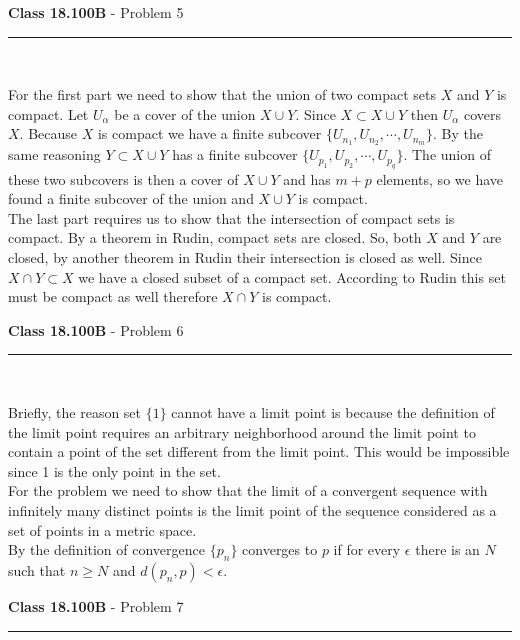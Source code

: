 \documentclass[11pt,reqno]{article}
\begin{document}
\vspace{15pt}
\begin{flushleft} 
\textbf{Class 18.100B} - Problem 5\\
\rule{500pt}{1pt}\\
\end{flushleft} 

For the first part we need to show that the union of two compact sets $X$ and $Y$ is compact. Let $U_{\alpha}$ be a cover of the union $X \cup Y$. Since $X \subset X \cup Y$ then $U_{\alpha}$ covers $X$. Because $X$ is compact we have a finite subcover $\{ U_{n_1}, U_{n_2}, \cdots, U_{n_m} \}$. By the same reasoning $Y \subset X \cup Y$ has a finite subcover $\{ U_{p_1}, U_{p_2}, \cdots, U_{p_q} \}$. The union of these two subcovers is then a cover of $X \cup Y$ and has $m + p$ elements, so we have found a finite subcover of the union and $X \cup Y$ is compact.\\
\indent The last part requires us to show that the intersection of compact sets is compact. By a theorem in Rudin, compact sets are closed. So, both $X$ and $Y$ are closed, by another theorem in Rudin their intersection is closed as well. Since $X \cap Y \subset X$ we have a closed subset of a compact set. According to Rudin this set must be compact as well therefore $X \cap Y$ is compact.

\vspace{15pt}
\begin{flushleft} 
\textbf{Class 18.100B} - Problem 6\\
\rule{500pt}{1pt}\\
\end{flushleft} 

Briefly, the reason set $\{ 1 \}$ cannot have a limit point is because the definition of the limit point requires an arbitrary neighborhood around the limit point to contain a point of the set different from the limit point. This would be impossible since 1 is the only point in the set.\\
\indent For the problem we need to show that the limit of a convergent sequence with infinitely many distinct points is the limit point of the sequence considered as a set of points in a metric space. \\
\indent By the definition of convergence $ \{ p_n \}$ converges to $p$ if for every $\epsilon$ there is an $N$ such that $n \ge N$ and $d(p_n,p) < \epsilon$.

\vspace{15pt}
\begin{flushleft} 
\textbf{Class 18.100B} - Problem 7\\
\rule{500pt}{1pt}\\
\end{flushleft} 
\end{document}
